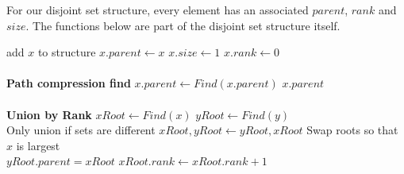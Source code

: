 \documentclass[12pt,a4paper]{article}
\begin{document}
	\begin{algorithm}
		For our disjoint set structure, every element has an associated $ parent $, $ rank $ and $ size $. The functions below are part of the disjoint set structure itself.
		\\
		\begin{algorithmic}
					\State add $ x $ to structure
					\State $ x.parent \gets x $
					\State $ x.size \gets 1 $
					\State $ x.rank \gets 0 $
				\EndIf
			\EndProcedure
			\\
			\\\textbf{Path compression find}
					\State $ x.parent \gets Find(x.parent) $
				\EndIf
				\Return $ x.parent $
			\EndProcedure
			\\
			\\\textbf{Union by Rank}
				\State $ xRoot \gets Find(x) $
				\State $ yRoot \gets Find(y) $
				\\
				 \Comment Only union if sets are different
						\State $ xRoot, yRoot \gets yRoot, xRoot $ \Comment Swap roots so that $x$ is largest
					\EndIf
					\\
					\State $ yRoot.parent = xRoot $
						\State $ xRoot.rank \gets xRoot.rank + 1 $
					\EndIf
				\EndIf
			\EndProcedure
		\end{algorithmic}
	\end{algorithm}
\end{document}
